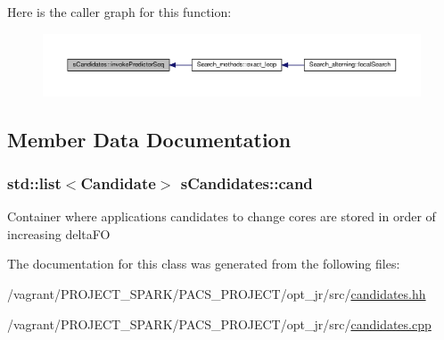 Here is the caller graph for this function\-:
\nopagebreak
\begin{figure}[H]
\begin{center}
\leavevmode
\includegraphics[width=350pt]{classsCandidates_a79ab5675418a37532bf447cfa8baf975_icgraph}
\end{center}
\end{figure}




\subsection{Member Data Documentation}
\hypertarget{classsCandidates_a71334f188ac386cd5958508288487832}{
\subsubsection[{cand}]{\setlength{\rightskip}{0pt plus 5cm}std\-::list$<${\bf Candidate}$>$ s\-Candidates\-::cand}}\label{classsCandidates_a71334f188ac386cd5958508288487832}
Container where applications candidates to change cores are stored in order of increasing delta\-F\-O 

The documentation for this class was generated from the following files\-:\begin{DoxyCompactItemize}
\item 
/vagrant/\-P\-R\-O\-J\-E\-C\-T\-\_\-\-S\-P\-A\-R\-K/\-P\-A\-C\-S\-\_\-\-P\-R\-O\-J\-E\-C\-T/opt\-\_\-jr/src/\hyperlink{candidates_8hh}{candidates.\-hh}\item 
/vagrant/\-P\-R\-O\-J\-E\-C\-T\-\_\-\-S\-P\-A\-R\-K/\-P\-A\-C\-S\-\_\-\-P\-R\-O\-J\-E\-C\-T/opt\-\_\-jr/src/\hyperlink{candidates_8cpp}{candidates.\-cpp}\end{DoxyCompactItemize}

